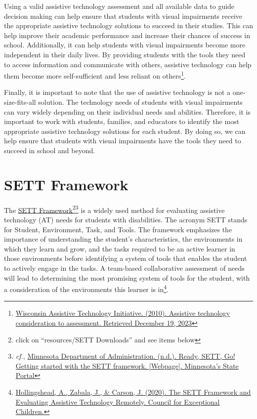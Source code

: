 Using a valid assistive technology assessment and all available data to guide decision making can help ensure that students with visual impairments receive the appropriate assistive technology solutions to succeed in their studies. This can help improve their academic performance and increase their chances of success in school. Additionally, it can help students with visual impairments become more independent in their daily lives. By providing students with the tools they need to access information and communicate with others, assistive technology can help them become more self-sufficient and less reliant on others\footnote{\raggedright \href{https://www.wati.org/free-publications/assistive-technology-consideration-to-assessment/}{Wisconsin Assistive Technology Initiative. (2010). Assistive technology consideration to assessment. Retrieved December 19, 2023}}.

Finally, it is important to note that the use of assistive technology is not a one-size-fits-all solution. The technology needs of students with visual impairments can vary widely depending on their individual needs and abilities. Therefore, it is important to work with students, families, and educators to identify the most appropriate assistive technology solutions for each student. By doing so, we can help ensure that students with visual impairments have the tools they need to succeed in school and beyond.

\pagebreak \hypertarget{trouble41}{}\section[SETT Framework]{SETT Framework}\label{trouble41}
The  \href{https://www.joyzabala.com/links-resources}{SETT Framework}\footnote{\raggedright click on ``resources/SETT Downloads'' and see items below}\fnsep\footnote{\raggedright \textit{cf.}, \href{https://mn.gov/admin/at/getting-started/ready-sett-go.jsp}{Minnesota Department of Administration. (n.d.). Ready, SETT, Go! Getting started with the SETT framework. [Webpage]. Minnesota’s State Portal}} is a widely used method for evaluating assistive technology (AT) needs for students with disabilities. The acronym SETT stands for Student, Environment, Task, and Tools. The framework emphasizes the importance of understanding the student’s characteristics, the environments in which they learn and grow, and the tasks required to be an active learner in those environments before identifying a system of tools that enables the student to actively engage in the tasks. A team-based collaborative assessment of needs will lead to determining the most promising system of tools for the student, with a consideration of the environments this learner is in\footnote{\raggedright \href{https://exceptionalchildren.org/blog/sett-framework-and-evaluating-assistive-technology-remotely}{Hollingshead, A., Zabala, J., \& Carson, J. (2020). The SETT Framework and Evaluating Assistive Technology Remotely. Council for Exceptional Children.} }.

